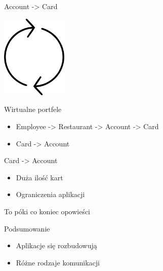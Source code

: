 \documentclass{beamer}
\begin{document}
\begin{frame}{Account -> Card}
	\begin{center}
		\includegraphics[height=4cm]{cykl1.png}
	\end{center}
\end{frame}

\begin{frame}{Wirtualne portfele}
	\begin{huge}
		\begin{itemize}
			\item Employee -> Restaurant -> Account -> Card
			\item Card -> Account
		\end{itemize}
	\end{huge}
\end{frame}

\begin{frame}{Card -> Account}
	\begin{huge}
		\begin{itemize}
			\item Duża ilość kart
			\item Ograniczenia aplikacji
		\end{itemize}
	\end{huge}
\end{frame}

\begin{frame}{}
	\begin{center}
		\Huge{To póki co koniec opowieści}
	\end{center}
\end{frame}

\begin{frame}{Podsumowanie}
	\begin{huge}
		\begin{itemize}[<+->]
			\item Aplikacje się rozbudowują
			\item Różne rodzaje komunikacji
		\end{itemize}
	\end{huge}
\end{frame}
\end{document}

